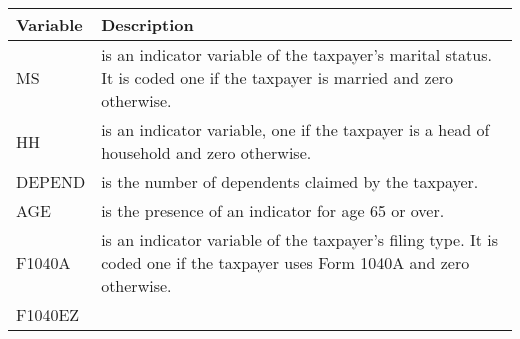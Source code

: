 \documentclass[]{book}
\begin{document}
\begin{longtable}[]{@{}ll@{}}
\toprule
\begin{minipage}[b]{0.09\columnwidth}\raggedright
Variable\strut
\end{minipage} & \begin{minipage}[b]{0.86\columnwidth}\raggedright
Description\strut
\end{minipage}\tabularnewline
\midrule
\endhead
\begin{minipage}[t]{0.09\columnwidth}\raggedright
MS\strut
\end{minipage} & \begin{minipage}[t]{0.86\columnwidth}\raggedright
is an indicator variable of the taxpayer's marital status. It is coded one if the taxpayer is married and zero otherwise.\strut
\end{minipage}\tabularnewline
\begin{minipage}[t]{0.09\columnwidth}\raggedright
HH\strut
\end{minipage} & \begin{minipage}[t]{0.86\columnwidth}\raggedright
is an indicator variable, one if the taxpayer is a head of household and zero otherwise.\strut
\end{minipage}\tabularnewline
\begin{minipage}[t]{0.09\columnwidth}\raggedright
DEPEND\strut
\end{minipage} & \begin{minipage}[t]{0.86\columnwidth}\raggedright
is the number of dependents claimed by the taxpayer.\strut
\end{minipage}\tabularnewline
\begin{minipage}[t]{0.09\columnwidth}\raggedright
AGE\strut
\end{minipage} & \begin{minipage}[t]{0.86\columnwidth}\raggedright
is the presence of an indicator for age 65 or over.\strut
\end{minipage}\tabularnewline
\begin{minipage}[t]{0.09\columnwidth}\raggedright
F1040A\strut
\end{minipage} & \begin{minipage}[t]{0.86\columnwidth}\raggedright
is an indicator variable of the taxpayer's filing type. It is coded one if the taxpayer uses Form 1040A and zero otherwise.\strut
\end{minipage}\tabularnewline
\begin{minipage}[t]{0.09\columnwidth}\raggedright
F1040EZ\strut

\end{minipage}
\end{longtable}
\end{document}
